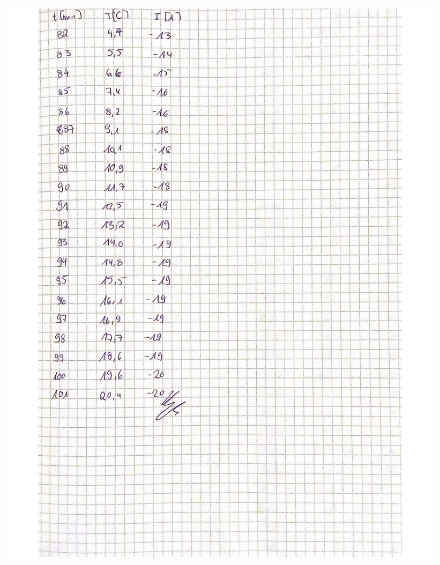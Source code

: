  \begin{figure}[H]
   \centering
   \includegraphics[width=\textwidth]{Bilder/Daten4.pdf}
   \label{fig:Messungen_4}
 \end{figure}
